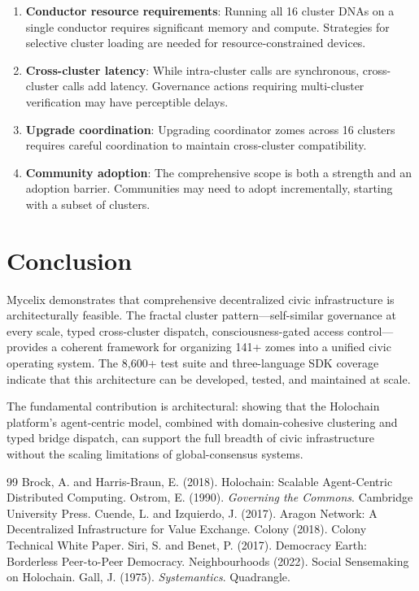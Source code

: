 \documentclass[11pt,twocolumn]{article}
\begin{document}
\begin{enumerate}
  \item \textbf{Conductor resource requirements}: Running all 16 cluster DNAs
    on a single conductor requires significant memory and compute. Strategies
    for selective cluster loading are needed for resource-constrained devices.
  \item \textbf{Cross-cluster latency}: While intra-cluster calls are synchronous,
    cross-cluster calls add latency. Governance actions requiring multi-cluster
    verification may have perceptible delays.
  \item \textbf{Upgrade coordination}: Upgrading coordinator zomes across 16
    clusters requires careful coordination to maintain cross-cluster compatibility.
  \item \textbf{Community adoption}: The comprehensive scope is both a strength
    and an adoption barrier. Communities may need to adopt incrementally,
    starting with a subset of clusters.
\end{enumerate}

\section{Conclusion}

Mycelix demonstrates that comprehensive decentralized civic infrastructure is
architecturally feasible. The fractal cluster pattern---self-similar governance
at every scale, typed cross-cluster dispatch, consciousness-gated access
control---provides a coherent framework for organizing 141+ zomes into a
unified civic operating system. The 8,600+ test suite and three-language SDK
coverage indicate that this architecture can be developed, tested, and
maintained at scale.

The fundamental contribution is architectural: showing that the Holochain
platform's agent-centric model, combined with domain-cohesive clustering and
typed bridge dispatch, can support the full breadth of civic infrastructure
without the scaling limitations of global-consensus systems.

\begin{thebibliography}{99}
   Brock, A. and Harris-Braun, E. (2018). Holochain:
    Scalable Agent-Centric Distributed Computing.
   Ostrom, E. (1990). \textit{Governing the Commons}.
    Cambridge University Press.
   Cuende, L. and Izquierdo, J. (2017). Aragon Network:
    A Decentralized Infrastructure for Value Exchange.
   Colony (2018). Colony Technical White Paper.
   Siri, S. and Benet, P. (2017). Democracy Earth:
    Borderless Peer-to-Peer Democracy.
   Neighbourhoods (2022). Social Sensemaking on
    Holochain.
   Gall, J. (1975). \textit{Systemantics}. Quadrangle.
\end{thebibliography}
\end{document}
